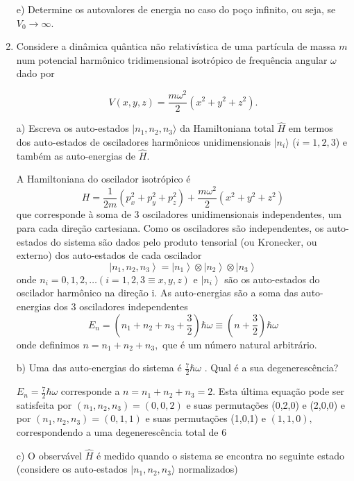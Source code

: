 \begin{enumerate}[start=1,label={\bfseries Q\arabic*.}]
\resposta

e) Determine os autovalores de energia no caso do poço infinito, ou seja, se $V_{0} \rightarrow \infty$.

\resposta





\item Considere a dinâmica quântica não relativística de uma partícula de massa $m$ num potencial harmônico tridimensional isotrópico de frequência angular $\omega$ dado por

$$
V(x,y,z) = \frac{m\omega^{2}}{2} \left( x^{2} + y^{2} + z^{2} \right).
$$



a) Escreva os auto-estados $|n_{1},n_{2},n_{3} \rangle$ da Hamiltoniana total $\hat{H}$ em termos dos auto-estados de osciladores harmônicos unidimensionais $| n_{i} \rangle$  ($i = 1,2,3$) e também as auto-energias de $\hat{H}$.

\resposta A Hamiltoniana do oscilador isotrópico é
$$
H=\frac{1}{2 m}\left(p_{x}^{2}+p_{y}^{2}+p_{z}^{2}\right)+\frac{m \omega^{2}}{2}\left(x^{2}+y^{2}+z^{2}\right)
$$
que corresponde à soma de 3 osciladores unidimensionais independentes, um para cada direção cartesiana. Como os osciladores são independentes, os auto-estados do sistema são dados pelo produto tensorial (ou Kronecker, ou externo) dos auto-estados de cada oscilador
$$
\left|n_{1}, n_{2}, n_{3}\right\rangle=\left|n_{1}\right\rangle \otimes\left|n_{2}\right\rangle \otimes\left|n_{3}\right\rangle
$$
onde $n_{i}=0,1,2, \ldots(i=1,2,3 \equiv x, y, z)$ e $\left|n_{i}\right\rangle$ são os auto-estados do oscilador harmônico na direção i. As auto-energias são a soma das auto-energias dos 3 osciladores independentes
$$
E_{n}=\left(n_{1}+n_{2}+n_{3}+\frac{3}{2}\right) \hbar \omega \equiv\left(n+\frac{3}{2}\right) \hbar \omega
$$
onde definimos $n=n_{1}+n_{2}+n_{3},$ que é um número natural arbitrário.


b) Uma das auto-energias do sistema é $\frac{7}{2}\hbar \omega$ . Qual é a sua degenerescência?

\resposta $E_{n}=\frac{7}{2} \hbar \omega$ corresponde a $n=n_{1}+n_{2}+n_{3}=2 .$ Esta última equação pode ser satisfeita por $\left(n_{1}, n_{2}, n_{3}\right)=(0,0,2)$ e suas permutações (0,2,0) e (2,0,0) e por $\left(n_{1}, n_{2}, n_{3}\right)=(0,1,1)$ e suas permutações (1,0,1) e $(1,1,0),$ correspondendo a uma degenerescência total de 6


c) O observável $\hat{H}$ é medido quando o sistema se encontra no seguinte estado (considere os auto-estados $|n_{1},n_{2},n_{3} \rangle$ normalizados)


\end{enumerate}
